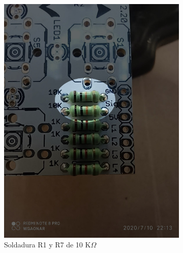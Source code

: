 \documentclass{article}
\begin{document}
\begin{figure}[htbp]
\begin{subfigure}[t]{0.3\textwidth}
        \includegraphics[width=0.9\columnwidth, height=1.2\columnwidth]{images/Botonera/botonera2.jpg}
        \caption{Soldadura R1 y R7 de 10 K$\Omega$}
        \label{fig:botonera_resistencias2}
    \end{subfigure}%
    \begin{subfigure}[t]{0.3\textwidth}
        \centering

\end{subfigure}
\end{figure}
\end{document}

